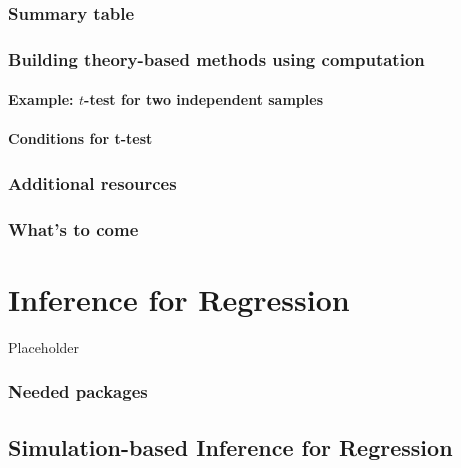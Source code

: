 \documentclass[12pt, krantz2,]{krantz}
\begin{document}
\hypertarget{ht-conclusion-table}{%
\subsection{Summary table}\label{ht-conclusion-table}}

\hypertarget{theory-hypo}{%
\subsection{Building theory-based methods using computation}\label{theory-hypo}}

\hypertarget{example-t-test-for-two-independent-samples}{%
\subsubsection*{\texorpdfstring{Example: \(t\)-test for two independent samples}{Example: t-test for two independent samples}}\label{example-t-test-for-two-independent-samples}}


\hypertarget{conditions-for-t-test}{%
\subsubsection*{Conditions for t-test}\label{conditions-for-t-test}}


\hypertarget{additional-resources-7}{%
\subsection{Additional resources}\label{additional-resources-7}}

\hypertarget{whats-to-come-8}{%
\subsection{What's to come}\label{whats-to-come-8}}

\hypertarget{inference-for-regression}{%
\chapter{Inference for Regression}\label{inference-for-regression}}

Placeholder

\hypertarget{needed-packages-8}{%
\subsection*{Needed packages}\label{needed-packages-8}}


\hypertarget{simulation-based-inference-for-regression}{%
\section{Simulation-based Inference for Regression}\label{simulation-based-inference-for-regression}}
\end{document}
